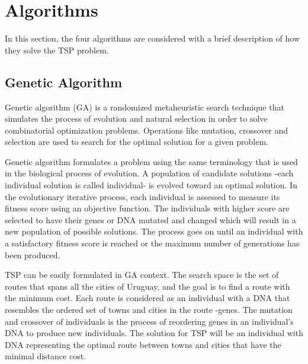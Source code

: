 \documentclass[twocolumn]{article}
\begin{document}
	\section{Algorithms}
	In this section, the four algorithms are considered with a brief description of how they solve the TSP problem.
	\subsection{Genetic Algorithm}
	
	Genetic algorithm (GA) is a randomized metaheuristic search technique that simulates the process of evolution and natural selection in order to solve combinatorial optimization problems. Operations like mutation, crossover and selection are used to search for the optimal solution for a given problem.
	
	Genetic algorithm formulates a problem using the same terminology that is used in the biological process of evolution. A population of candidate solutions -each individual solution is called individual- is evolved toward an optimal solution. In the evolutionary iterative process, each individual is assessed to measure its fitness score using an objective function. The individuals with higher score are selected to have their genes or DNA mutated and changed which will result in a new population of possible solutions. The process goes on until an individual with a satisfactory fitness score is reached or the maximum number of generations has been produced.
	
	TSP can be easily formulated in GA context. The search space is the set of routes that spans all the cities of Uruguay, and the goal is to find a route with the minimum cost. Each route is considered as an individual with a DNA that resembles the ordered set of towns and cities in the route -genes. The mutation and crossover of individuals is the process of reordering genes in an individual's DNA to produce new individuals. The solution for TSP will be an individual with DNA representing the optimal route between towns and cities that have the minimal distance cost.
	
\end{document}
